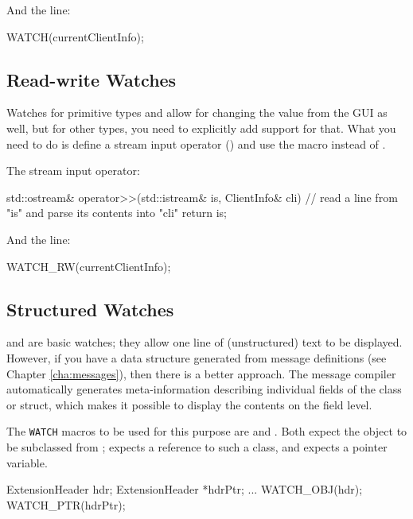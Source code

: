 And the  line:

\begin{cpp}
WATCH(currentClientInfo);
\end{cpp}


\subsection{Read-write Watches}
\label{sec:sim-lib:read-write-watches}

Watches for primitive types and  allow for changing
the value from the GUI as well, but for other types, you need to explicitly
add support for that. What you need to do is define a stream input
operator () and use the  macro instead of
.

The stream input operator:

\begin{cpp}
std::ostream& operator>>(std::istream& is, ClientInfo& cli)
{
    // read a line from "is" and parse its contents into "cli"
    return is;
}
\end{cpp}

And the  line:

\begin{cpp}
WATCH_RW(currentClientInfo);
\end{cpp}


\subsection{Structured Watches}
\label{sec:sim-lib:structured-watches}

 and  are basic watches; they allow one
line of (unstructured) text to be displayed. However, if you have a
data structure generated from message definitions (see Chapter \ref{cha:messages}),
then there is a better approach. The message compiler automatically generates
meta-information describing individual fields of the class or struct,
which makes it possible to display the contents on the field level.

The \texttt{WATCH} macros to be used for this purpose are 
and . Both expect the object to be subclassed from
;  expects a reference to such a class,
and  expects a pointer variable.

\begin{cpp}
ExtensionHeader hdr;
ExtensionHeader *hdrPtr;
...
WATCH_OBJ(hdr);
WATCH_PTR(hdrPtr);
\end{cpp}


